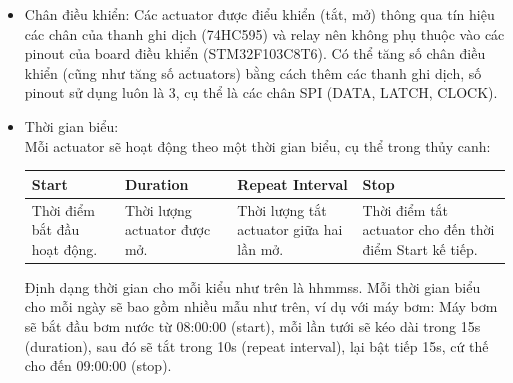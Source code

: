 \documentclass[a4paper,12pt,oneside]{article}
\begin{document}
\begin{itemize}
\item Chân điều khiển: Các actuator được điểu khiển (tắt, mở) thông qua tín hiệu các chân của thanh ghi dịch (74HC595) và relay nên không phụ thuộc vào các pinout của board điều khiển (STM32F103C8T6). Có thể tăng số chân điều khiển (cũng như tăng số actuators) bằng cách thêm các thanh ghi dịch, số pinout sử dụng luôn là 3, cụ thể là các chân SPI (DATA, LATCH, CLOCK).

\item Thời gian biểu:\\
Mỗi actuator sẽ hoạt động theo một thời gian biểu, cụ thể trong thủy canh:

\begin{center}
\begin{tabularx}{\linewidth}{ |X|X|X|X| }
\hline
Start & Duration & Repeat Interval & Stop\\
\hline
Thời điểm bắt đầu hoạt động. & Thời lượng actuator được mở. & Thời lượng tắt actuator giữa hai lần mở. & Thời điểm tắt actuator cho đến thời điểm Start kế tiếp.\\
\hline
\end{tabularx}
\end{center}

\noindent Định dạng thời gian cho mỗi kiểu như trên là hhmmss. Mỗi thời gian biểu cho mỗi ngày sẽ bao gồm nhiều mẫu như trên, ví dụ với máy bơm: Máy bơm sẽ bắt đầu bơm nước từ 08:00:00 (start), mỗi lần tưới sẽ kéo dài trong 15s (duration), sau đó sẽ tắt trong 10s (repeat interval), lại bật tiếp 15s, cứ thế cho đến 09:00:00 (stop).



\end{itemize}
\end{document}
